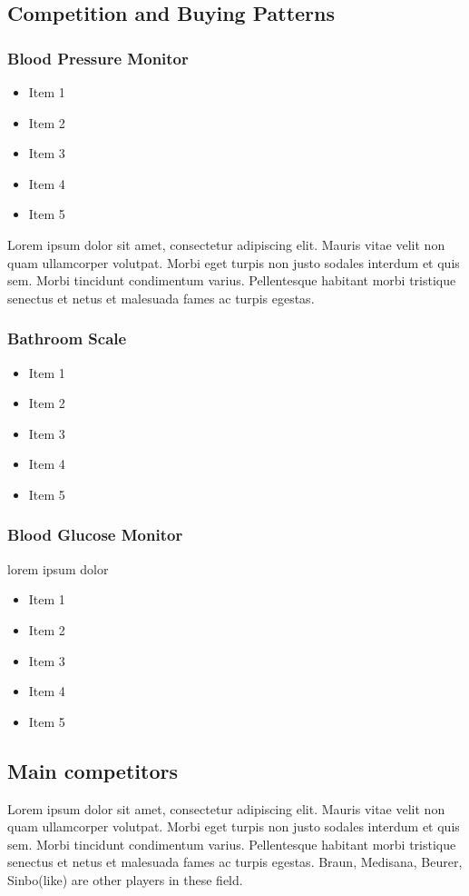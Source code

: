 \documentclass[11pt]{article}
\begin{document}
\subsection{Competition and Buying Patterns}

\subsubsection{Blood Pressure Monitor}
\begin{itemize}
\item Item 1
\item Item 2
\item Item 3
\item Item 4
\item Item 5
\end{itemize}
Lorem ipsum dolor sit amet, consectetur adipiscing elit. Mauris vitae velit 
non quam ullamcorper volutpat. Morbi eget turpis non justo sodales interdum 
et quis sem. Morbi tincidunt condimentum varius. Pellentesque habitant morbi 
tristique senectus et netus et malesuada fames ac turpis egestas.\newline
\subsubsection{Bathroom Scale}
\begin{itemize}
\item Item 1
\item Item 2
\item Item 3
\item Item 4
\item Item 5
\end{itemize}
\subsubsection{Blood Glucose Monitor}
lorem ipsum dolor
\begin{itemize}
\item Item 1
\item Item 2
\item Item 3
\item Item 4
\item Item 5
\end{itemize}
\subsection{Main competitors}
Lorem ipsum dolor sit amet, consectetur adipiscing elit. Mauris vitae velit 
non quam ullamcorper volutpat. Morbi eget turpis non justo sodales interdum 
et quis sem. Morbi tincidunt condimentum varius. Pellentesque habitant morbi 
tristique senectus et netus et malesuada fames ac turpis egestas.\newline
Braun, Medisana, Beurer, Sinbo(like) are other players in these field.
\end{document}
